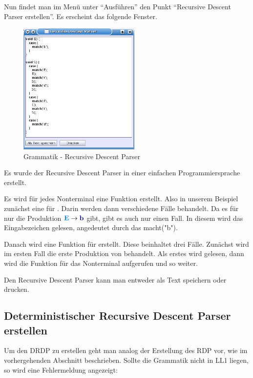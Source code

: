 Nun findet man im Menü unter "`Ausführen"' den Punkt "`Recursive Descent Parser erstellen"'. Es erscheint das folgende Fenster.

\begin{figure}[h]
\begin{center}
\includegraphics[width=6cm]{../images/rdp.png}
\caption{Grammatik - Recursive Descent Parser}
\end{center}
\end{figure}

Es wurde der Recursive Descent Parser in einer einfachen Programmiersprache erstellt.

Es wird für jedes Nonterminal eine Funktion erstellt. Also in unserem Beispiel zunächst eine für . Darin werden dann verschiedene Fälle behandelt. Da es für  nur die Produktion $\NonterminalSymbol{E} \to \TerminalSymbol{b}$ gibt, gibt es auch nur einen Fall. In diesem wird das Eingabezeichen  gelesen, angedeutet durch das macht("b").

Danach wird eine Funktion für  erstellt. Diese beinhaltet drei Fälle. Zunächst wird im ersten Fall die erste Produktion von  behandelt. Als erstes wird  gelesen, dann wird die Funktion für das Nonterminal  aufgerufen und so weiter.

Den Recursive Descent Parser kann man entweder als Text speichern oder drucken.

\subsection{Deterministischer Recursive Descent Parser erstellen}

Um den DRDP zu erstellen geht man analog der Erstellung des RDP vor, wie im vorhergehenden Abschnitt beschrieben. Sollte die Grammatik nicht in LL1 liegen, so wird
eine Fehlermeldung angezeigt:

